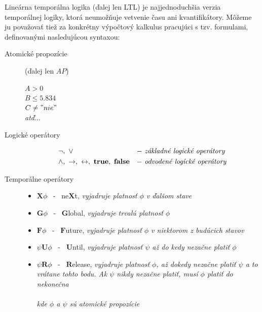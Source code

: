 \documentclass[11pt,final,oneside]{fithesis}
\begin{document}
Line\' arna tempor\' alna logika (\v dalej len LTL) je najjednoduch\v sia verzia tempor\' alnej logiky, ktor\' a neumo\v z\v nuje vetvenie \v casu 
ani kvantifik\' atory.
M\^ o\v zeme ju pova\v zova\v t tie\v z za konkr\' etny v\' ypo\v ctov\' y kalkulus pracuj\' uci s tzv. formulami, definovan\' ymi nasleduj\' ucou syntaxou:
\begin{description}
\item[Atomick\' e propoz\' icie] (\v dalej len $AP$) \hfill
\begin{center}
$A > 0$ \\
$B \leq 5.834$ \\
$C \neq "nie"$ \\
{\it at\v d$\dots{}$}
\end{center}
\item[Logick\' e oper\' atory] \hfill
\begin{align*}	%
&\neg, \ \vee &-& \ \textrm{\it z\' akladn\' e logick\' e oper\' atory}\\
&\wedge , \ \rightarrow , \ \leftrightarrow , \ \mathbf{true} , \ \mathbf{false} \hfil &-& \ \textrm{\it odvoden\' e logick\' e oper\' atory}
\end{align*}
\item[Tempor\' alne oper\' atory] \hfill
\begin{itemize}
\item $\mathbf{X} \phi$ \ - \ \textrm{ne}$\mathbf{X}$\textrm{t, {\it vyjadruje platnos\v t $\phi$ v \v dal\v som stave}}
\item $\mathbf{G} \phi$ \ - \ $\mathbf{G}$\textrm{lobal, {\it vyjadruje trval\' u platnos\v t $\phi$ }}
\item {$\mathbf{F} \phi$} \ - \ $\mathbf{F}$\textrm{uture, {\it vyjadruje platnos\v t $\phi$ v niektorom z bud\' ucich stavov }}
\item {$\psi \mathbf{U} \phi$} \ - \ $\mathbf{U}$\textrm{ntil, {\it vyjadruje platnos\v t $\psi$ a\v z do kedy neza\v cne plati\v t $\phi$}}
\item {$\psi \mathbf{R} \phi$} \ - \ $\mathbf{R}$\textrm{elease, {\it vyjadruje platnos\v t $\phi$, a\v z dokedy neza\v cne plati\v t $\psi$ 
a to vr\'atane tohto bodu. Ak $\psi$ nikdy neza\v cne plati\v t, mus\'i $\phi$ plati\v t do nekone\v cna}}\\
\\
{\it kde $\phi$ a $\psi$ s\' u atomick\' e propoz\' icie}
\end{itemize}
\end{description}
\end{document}
